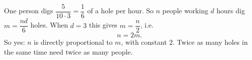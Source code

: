 One person digs $\dfrac{5}{10\cdot3}=\dfrac16$ of a hole per hour. So $n$ people working $d$ hours dig $m=\dfrac{nd}{6}$ holes. When $d=3$ this gives $m=\dfrac n2$, i.e.
\[\boxed{n=2m}.\]
So yes: $n$ is directly proportional to $m$, with constant $2$. Twice as many holes in the same time need twice as many people.
